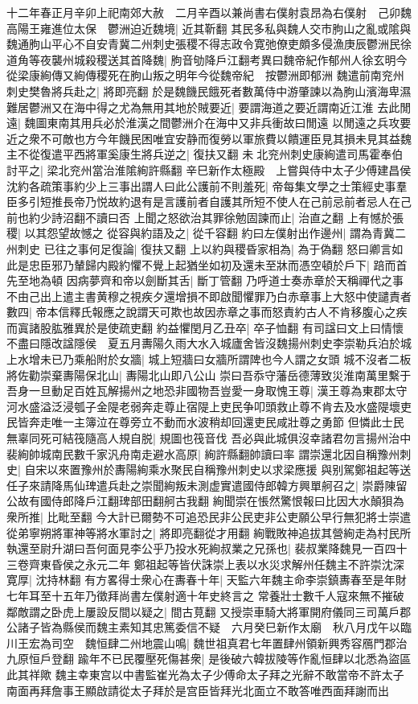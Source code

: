十二年春正月辛卯上祀南郊大赦　二月辛酉以兼尚書右僕射袁昂為右僕射　己卯魏高陽王雍進位太保　鬱洲迫近魏境|{
	近其靳翻}
其民多私與魏人交市朐山之亂或隂與魏通朐山平心不自安青冀二州刺史張稷不得志政令寛弛僚吏頗多侵漁庚辰鬱洲民徐道角等夜襲州城殺稷送其首降魏|{
	胊音劬降戶江翻考異曰魏帝紀作郁州人徐玄明今從梁康絢傳又絢傳稷死在朐山叛之明年今從魏帝紀　按鬱洲即郁洲}
魏遣前南兖州刺史樊魯將兵赴之|{
	將即亮翻}
於是魏饑民餓死者數萬侍中游肇諫以為朐山濱海卑濕難居鬱洲又在海中得之尤為無用其地於賊要近|{
	要謂海道之要近謂南近江淮}
去此閒遠|{
	魏圖東南其用兵必於淮漢之間鬱洲介在海中又非兵衝故曰閒遠}
以閒遠之兵攻要近之衆不可敵也方今年饑民困唯宜安静而復勞以軍旅費以饋運臣見其損未見其益魏主不從復遣平西將軍奚康生將兵逆之|{
	復扶又翻}
未北兖州刺史康絢遣司馬霍奉伯討平之|{
	梁北兖州當治淮隂絢許縣翻}
辛巳新作太極殿　上嘗與侍中太子少傅建昌侯沈約各疏策事約少上三事出謂人曰此公護前不則羞死|{
	帝每集文學之士策經史事羣臣多引短推長帝乃悦故約退有是言護前者自護其所短不使人在己前忌前者忌人在己前也約少詩沼翻不讀曰否}
上聞之怒欲治其罪徐勉固諫而止|{
	治直之翻}
上有憾於張稷|{
	以其怨望故憾之}
從容與約語及之|{
	從千容翻}
約曰左僕射出作邊州|{
	謂為青冀二州刺史}
已往之事何足復論|{
	復扶又翻}
上以約與稷昏家相為|{
	為于偽翻}
怒曰卿言如此是忠臣邪乃輦歸内殿約懼不覺上起猶坐如初及還未至牀而憑空頓於戶下|{
	踣而首先至地為頓}
因病夢齊和帝以劍斷其舌|{
	斷丁管翻}
乃呼道士奏赤章於天稱禪代之事不由己出上遣主書黄穆之視疾夕還增損不即啟聞懼罪乃白赤章事上大怒中使譴責者數四|{
	帝本信釋氏報應之說謂天可欺也故因赤章之事而怒責約古人不肯移腹心之疾而寘諸股肱雅異於是使疏吏翻}
約益懼閏月乙丑卒|{
	卒子恤翻}
有司諡曰文上曰情懷不盡曰隱改諡隱侯　夏五月夀陽久雨大水入城廬舍皆沒魏揚州刺史李崇勒兵泊於城上水增未已乃乘船附於女牆|{
	城上短牆曰女牆所謂陴也今人謂之女頭}
城不沒者二板將佐勸崇棄夀陽保北山|{
	夀陽北山即八公山}
崇曰吾忝守藩岳德薄致災淮南萬里繫于吾身一旦動足百姓瓦解揚州之地恐非國物吾豈愛一身取愧王尊|{
	漢王尊為東郡太守河水盛溢泛浸瓠子金隄老弱奔走尊止宿隄上吏民争叩頭救止尊不肯去及水盛隄壞吏民皆奔走唯一主簿泣在尊旁立不動而水波稍却回還吏民咸壯尊之勇節}
但憐此士民無辜同死可結筏隨高人規自脱|{
	規圖也筏音伐}
吾必與此城俱沒幸諸君勿言揚州治中裴絢帥城南民數千家汎舟南走避水高原|{
	絢許縣翻帥讀曰率}
謂崇還北因自稱豫州刺史|{
	自宋以來置豫州於夀陽絢乘水聚民自稱豫州刺史以求梁應援}
與别駕鄭祖起等送任子來請降馬仙琕遣兵赴之崇聞絢叛未測虚實遣國侍郎韓方興單舸召之|{
	崇爵陳留公故有國侍郎降戶江翻琕部田翻舸古我翻}
絢聞崇在悵然驚恨報曰比因大水顛狽為衆所推|{
	比毗至翻}
今大計已爾勢不可追恐民非公民吏非公吏願公早行無犯將士崇遣從弟寧朔將軍神等將水軍討之|{
	將即亮翻從才用翻}
絢戰敗神追拔其營絢走為村民所執還至尉升湖曰吾何面見李公乎乃投水死絢叔業之兄孫也|{
	裴叔業降魏見一百四十三卷齊東昏侯之永元二年}
鄭祖起等皆伏誅崇上表以水災求解州任魏主不許崇沈深寛厚|{
	沈持林翻}
有方畧得士衆心在夀春十年|{
	天監六年魏主命李崇鎮夀春至是年財七年耳至十五年乃徵拜尚書左僕射適十年史終言之}
常養壯士數千人寇來無不摧破鄰敵謂之卧虎上屢設反間以疑之|{
	間古莧翻}
又授崇車騎大將軍開府儀同三司萬戶郡公諸子皆為縣侯而魏主素知其忠篤委信不疑　六月癸巳新作太廟　秋八月戊午以臨川王宏為司空　魏恒肆二州地震山鳴|{
	魏世祖真君七年置肆州領新興秀容鴈門郡治九原恒戶登翻}
踰年不已民覆壓死傷甚衆|{
	是後破六韓拔陵等作亂恒肆以北悉為盜區此其祥歟}
魏主幸東宫以中書監崔光為太子少傅命太子拜之光辭不敢當帝不許太子南面再拜詹事王顯啟請從太子拜於是宫臣皆拜光北面立不敢答唯西面拜謝而出

